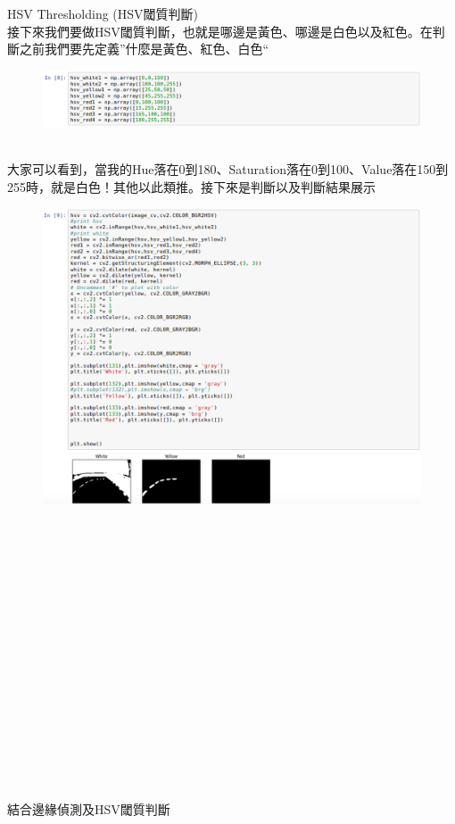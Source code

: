 \documentclass{article}
\begin{document}
\\\\\\\\\\\\\\
HSV Thresholding (HSV閾質判斷)
\\接下來我們要做HSV閾質判斷，也就是哪邊是黃色、哪邊是白色以及紅色。在判斷之前我們要先定義”什麼是黃色、紅色、白色“
\begin{figure}[htp]
    \begin{center}
        \includegraphics[width=400pt]{pic/3_2_14.png}
    \end{center}
\end{figure}
\\
大家可以看到，當我的Hue落在0到180、Saturation落在0到100、Value落在150到255時，就是白色！其他以此類推。接下來是判斷以及判斷結果展示
\begin{figure}[htp]
    \begin{center}
        \includegraphics[width=350pt]{pic/3_2_15.png}
    \end{center}
\end{figure}
\\
\\\\\\\\\\\\\\\\\\\\\\\\\\\\\\結合邊緣偵測及HSV閾質判斷
\end{document}
